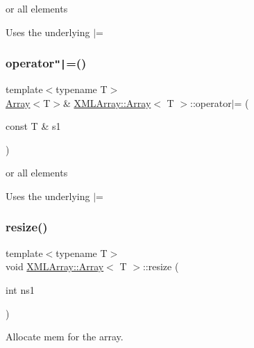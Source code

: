 or all elements 

Uses the underlying $\vert$= \mbox{\label{classXMLArray_1_1Array_a719213ff71df03fd3e561d1d4f9656cc}} 
\subsubsection{\texorpdfstring{operator\texttt{"|}=()}{operator|=()}\hspace{0.1cm}{\footnotesize\ttfamily [6/6]}}
{\footnotesize\ttfamily template$<$typename T$>$ \\
\mbox{\hyperlink{classXMLArray_1_1Array}{Array}}$<$T$>$\& \mbox{\hyperlink{classXMLArray_1_1Array}{X\+M\+L\+Array\+::\+Array}}$<$ T $>$\+::operator$\vert$= (\begin{DoxyParamCaption}\item[{const T \&}]{s1 }\end{DoxyParamCaption})\hspace{0.3cm}{\ttfamily [inline]}}



or all elements 

Uses the underlying $\vert$= \mbox{\label{classXMLArray_1_1Array_a470913fde270ad0e578041654e2390f0}} 
\subsubsection{\texorpdfstring{resize()}{resize()}\hspace{0.1cm}{\footnotesize\ttfamily [1/3]}}
{\footnotesize\ttfamily template$<$typename T$>$ \\
void \mbox{\hyperlink{classXMLArray_1_1Array}{X\+M\+L\+Array\+::\+Array}}$<$ T $>$\+::resize (\begin{DoxyParamCaption}\item[{int}]{ns1 }\end{DoxyParamCaption})\hspace{0.3cm}{\ttfamily [inline]}}



Allocate mem for the array. 

